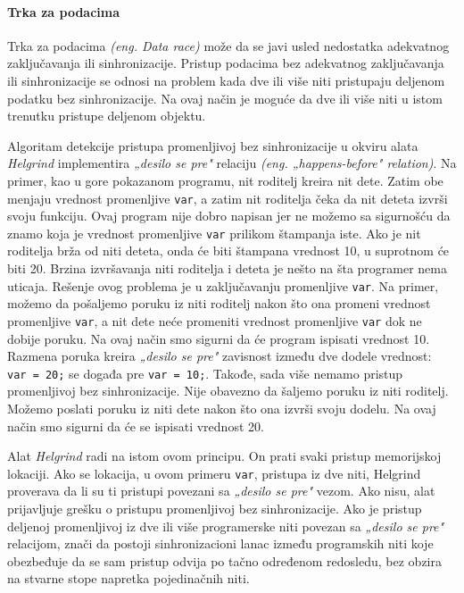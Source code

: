 \paragraph{Trka za podacima}\label{trka-za-podacima}

Trka za podacima \emph{(eng. Data race)} može da se javi usled nedostatka adekvatnog zaključavanja ili sinhronizacije. Pristup podacima bez adekvatnog zaključavanja ili sinhronizacije se odnosi na problem kada dve ili više niti pristupaju deljenom podatku bez sinhronizacije. Na ovaj način je moguće da dve ili više niti u istom trenutku pristupe deljenom objektu.

Algoritam detekcije pristupa promenljivoj bez sinhronizacije u okviru alata \emph{Helgrind} implementira \emph{„desilo se pre"} relaciju \emph{(eng. „happens-before" relation)}. Na primer, kao u gore pokazanom programu, nit roditelj kreira nit dete. Zatim obe menjaju vrednost promenljive \texttt{var}, a zatim nit roditelja čeka da nit deteta izvrši svoju funkciju. Ovaj program nije dobro napisan jer ne možemo sa sigurnošću da znamo koja je vrednost promenljive \texttt{var} prilikom štampanja iste. Ako je nit roditelja brža od niti deteta, onda će biti štampana vrednost 10, u suprotnom će biti 20. Brzina izvršavanja niti roditelja i deteta je nešto na šta programer nema uticaja. Rešenje ovog problema je u zaključavanju promenljive \texttt{var}. Na primer, možemo da pošaljemo poruku iz niti roditelj nakon što ona promeni vrednost promenljive \texttt{var}, a nit dete neće promeniti vrednost promenljive \texttt{var} dok ne dobije poruku. Na ovaj način smo sigurni da će program ispisati vrednost 10. Razmena poruka kreira \emph{„desilo se pre"} zavisnost između dve dodele vrednost: \texttt{var\ =\ 20;} se događa pre \texttt{var\ =\ 10;}. Takođe, sada više nemamo pristup promenljivoj bez sinhronizacije. Nije obavezno da šaljemo poruku iz niti roditelj. Možemo poslati poruku iz niti dete nakon što ona izvrši svoju dodelu. Na ovaj način smo sigurni da će se ispisati vrednost 20.

Alat \emph{Helgrind} radi na istom ovom principu. On prati svaki pristup memorijskoj lokaciji. Ako se lokacija, u ovom primeru \texttt{var}, pristupa iz dve niti, Helgrind proverava da li su ti pristupi povezani sa \emph{„desilo se pre"} vezom. Ako nisu, alat prijavljuje grešku o pristupu promenljivoj bez sinhronizacije. Ako je pristup deljenoj promenljivoj iz dve ili više programerske niti povezan sa \emph{„desilo se pre"} relacijom, znači da postoji sinhronizacioni lanac između programskih niti koje obezbeđuje da se sam pristup odvija po tačno određenom redosledu, bez obzira na stvarne stope napretka pojedinačnih niti.

